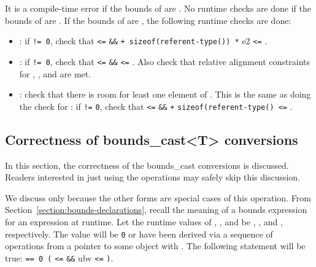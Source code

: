 It is a compile-time error if the bounds of  are
\boundsnone. No runtime checks are done if the bounds of 
are \boundsany. If the bounds of  are
, the following
runtime checks are done:

\begin{itemize}
\item
  :
   if  \texttt{!= 0}, check that 
  \texttt{<=}  \texttt{\&\&}  \texttt{+
  sizeof(referent-type(}\texttt{)) *} e2 \texttt{<=}
  .
\item
  : if  \texttt{!= 0},
  check that  \texttt{<=}  \texttt{\&\&}
   \texttt{<=} . Also check that relative
  alignment constraints for , , and  are met.
\item
  :
  check that there is room for least one element of . This is
  the same as doing the check for
  : if  \texttt{!=} \texttt{0}, check that 
  \texttt{<=}  \texttt{\&\&}  \texttt{+}
  \texttt{sizeof(referent-type(}\texttt{) <=}
  .
\end{itemize}

\subsection{Correctness of bounds\_cast\textless{}T\textgreater{} conversions}

In this section, the correctness of the bounds\_cast conversions is
discussed. Readers interested in just using the operations may safely
skip this discussion.

We discuss only
 because the other forms are special cases
of this operation. From Section~\ref{section:bounds-declarations},
recall the meaning of a bounds
expression  for
an expression  at runtime. Let the runtime values of ,
, and  be , , and ,
respectively. The value  will be \texttt{0} or have been
derived via a sequence of operations from a pointer to some object
 with .
The following statement will be true: 
\texttt{== 0 \textbar{}\textbar{} (} \texttt{<=}
 \texttt{\&\&} ubv \texttt{<=}
\texttt{)}.

